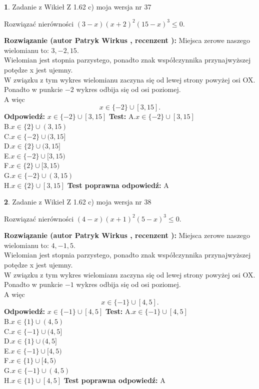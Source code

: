 \documentclass[12pt, a4paper]{article}
\theoremstyle{definition} %
\newtheorem{zad}{}
\newcommand{\zadStart}[1]{\begin{zad}#1\newline}
\newcommand{\zadStop}{\end{zad}}
\newcommand{\rozwStart}[2]{\noindent \textbf{Rozwiązanie (autor #1 , recenzent #2): }\newline}
\newcommand{\rozwStop}{\newline}
\newcommand{\odpStart}{\noindent \textbf{Odpowiedź:}\newline}
\newcommand{\odpStop}{\newline}
\newcommand{\testStart}{\noindent \textbf{Test:}\newline}
\newcommand{\testStop}{\newline}
\newcommand{\kluczStart}{\noindent \textbf{Test poprawna odpowiedź:}\newline}
\newcommand{\kluczStop}{\newline}
\begin{document}
\zadStart{Zadanie z Wikieł Z 1.62 c) moja wersja nr 37}

Rozwiązać nierówności $(3-x)(x+2)^{2}(15-x)^{3}\le0$.
\zadStop
\rozwStart{Patryk Wirkus}{}
Miejsca zerowe naszego wielomianu to: $3, -2, 15$.\\
Wielomian jest stopnia parzystego, ponadto znak współczynnika przy\linebreak najwyższej potędze x jest ujemny.\\ W związku z tym wykres wielomianu zaczyna się od lewej strony powyżej osi OX.\\
Ponadto w punkcie $-2$ wykres odbija się od osi poziomej.\\
A więc $$x \in \{-2\} \cup [3,15].$$
\rozwStop
\odpStart
$x \in \{-2\} \cup [3,15]$
\odpStop
\testStart
A.$x \in \{-2\} \cup [3,15]$\\
B.$x \in \{2\} \cup (3,15)$\\
C.$x \in \{-2\} \cup (3,15]$\\
D.$x \in \{2\} \cup (3,15]$\\
E.$x \in \{-2\} \cup [3,15)$\\
F.$x \in \{2\} \cup [3,15)$\\
G.$x \in \{-2\} \cup (3,15)$\\
H.$x \in \{2\} \cup [3,15]$
\testStop
\kluczStart
A
\kluczStop



\zadStart{Zadanie z Wikieł Z 1.62 c) moja wersja nr 38}

Rozwiązać nierówności $(4-x)(x+1)^{2}(5-x)^{3}\le0$.
\zadStop
\rozwStart{Patryk Wirkus}{}
Miejsca zerowe naszego wielomianu to: $4, -1, 5$.\\
Wielomian jest stopnia parzystego, ponadto znak współczynnika przy\linebreak najwyższej potędze x jest ujemny.\\ W związku z tym wykres wielomianu zaczyna się od lewej strony powyżej osi OX.\\
Ponadto w punkcie $-1$ wykres odbija się od osi poziomej.\\
A więc $$x \in \{-1\} \cup [4,5].$$
\rozwStop
\odpStart
$x \in \{-1\} \cup [4,5]$
\odpStop
\testStart
A.$x \in \{-1\} \cup [4,5]$\\
B.$x \in \{1\} \cup (4,5)$\\
C.$x \in \{-1\} \cup (4,5]$\\
D.$x \in \{1\} \cup (4,5]$\\
E.$x \in \{-1\} \cup [4,5)$\\
F.$x \in \{1\} \cup [4,5)$\\
G.$x \in \{-1\} \cup (4,5)$\\
H.$x \in \{1\} \cup [4,5]$
\testStop
\kluczStart
A
\kluczStop
\end{document}
